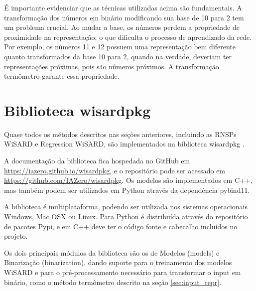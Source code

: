 É importante evidenciar que as técnicas utilizadas acima são fundamentais. A transformação dos números em binário modificando sua base de 10 para 2 tem um problema crucial. Ao mudar a base, os números perdem a propriedade de proximidade na representação, o que dificulta o processo de aprendizado da rede. Por exemplo, os números 11 e 12 possuem uma representação bem diferente quanto transformados da base 10 para 2, quando na verdade, deveriam ter representações próximas, pois são números próximos. A transformação termômetro garante essa propriedade.

\section{Biblioteca wisardpkg}
Quase todos os métodos descritos nas seções anteriores, incluindo as RNSPs WiSARD e Regression WiSARD, são implementados na biblioteca wisardpkg \cite{wisardpkg}.

A documentação da biblioteca fica hospedada no GitHub em \url{https://iazero.github.io/wisardpkg}, e o repositório pode ser acessado em \url{https://github.com/IAZero/wisardpkg}. Os modelos são implementados em C++, mas também podem ser utilizados em Python através da dependência pybind11.

A biblioteca é multiplataforma, podendo ser utilizada nos sistemas operacionais Windows, Mac OSX ou Linux. Para Python é distribuída através do repositório de pacotes Pypi, e em C++ deve ter o código fonte e cabecalho incluídos no projeto.

Os dois principais módulos da biblioteca são os de Modelos (models) e Binarização (binarization), dando suporte para o treinamento dos modelos WiSARD e para o pré-processamento necessário para transformar o input em binário, como o método termômetro descrito na seção \ref{sec:input_repr}.